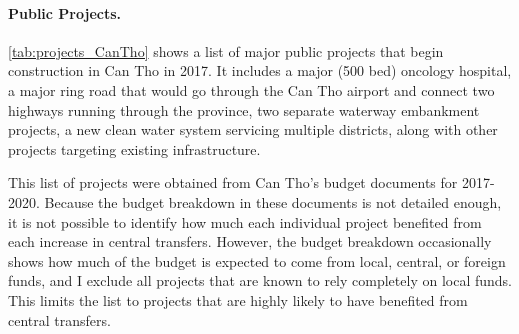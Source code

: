 \documentclass[12pt]{article}
\newcommand{\1}{\mathbbm{1}}
\begin{document}
\paragraph{Public Projects.} 

\autoref{tab:projects_CanTho} shows a list of major public projects that begin construction in Can Tho in 2017. It includes a major (500 bed) oncology hospital, a major ring road that would go through the Can Tho airport and connect two highways running through the province, two separate waterway embankment projects, a new clean water system servicing multiple districts, along with other projects targeting existing infrastructure. 

This list of projects were obtained from Can Tho's budget documents for 2017-2020. Because the budget breakdown in these documents is not detailed enough, it is not possible to identify how much each individual project benefited from each increase in central transfers. However, the budget breakdown occasionally shows how much of the budget is expected to come from local, central, or foreign funds, and I exclude all projects that are known to rely completely on local funds. This limits the list to projects that are highly likely to have benefited from central transfers.
\end{document}
